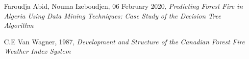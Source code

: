 \documentclass[10pt]{article}
\numberwithin{equation}{section}
\numberwithin{figure}{section}
\numberwithin{table}{section}
\begin{document}
\begin{thebibliography}{}
 Faroudja Abid, Nouma Izeboudjen, 06 February 2020, \textit{Predicting Forest Fire in Algeria Using Data Mining Techniques: Case Study of the Decision Tree Algorithm}

 C.E Van Wagner, 1987, \textit{Development and Structure of the Canadian Forest Fire Weather Index System}

\end{thebibliography}
\end{document}
